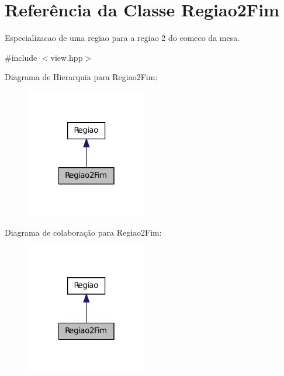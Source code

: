 \hypertarget{classRegiao2Fim}{
\section{Referência da Classe Regiao2Fim}
\label{classRegiao2Fim}
}


Especializacao de uma regiao para a regiao 2 do comeco da mesa.  




{\ttfamily \#include $<$view.hpp$>$}



Diagrama de Hierarquia para Regiao2Fim:\nopagebreak
\begin{figure}[H]
\begin{center}
\leavevmode
\includegraphics[width=150pt]{classRegiao2Fim__inherit__graph}
\end{center}
\end{figure}


Diagrama de colaboração para Regiao2Fim:\nopagebreak
\begin{figure}[H]
\begin{center}
\leavevmode
\includegraphics[width=150pt]{classRegiao2Fim__coll__graph}
\end{center}
\end{figure}
